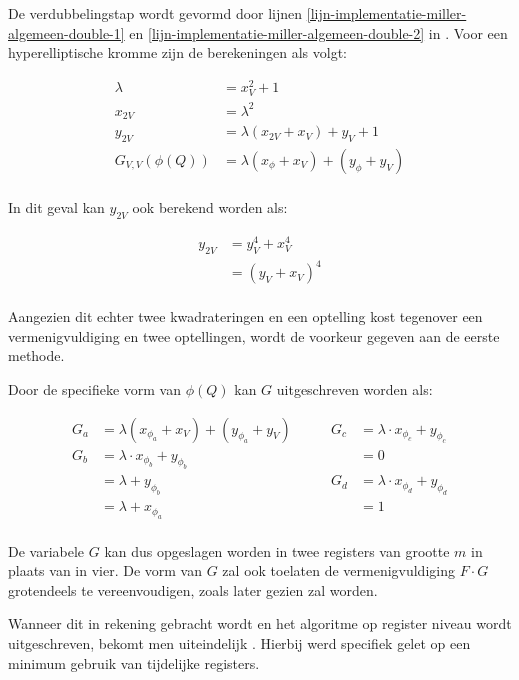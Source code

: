 De verdubbelingstap wordt gevormd door lijnen \ref{lijn-implementatie-miller-algemeen-double-1} en \ref{lijn-implementatie-miller-algemeen-double-2} in . Voor een hyperelliptische kromme zijn de berekeningen als volgt\cite{bertoni}:

\[\begin{aligned}
	\lambda &= x_V^2 + 1\\
	x_{2V} &= \lambda ^2\\
	y_{2V} &= \lambda (x_{2V} + x_V) + y_V + 1\\
	G_{V,V}(\phi(Q)) &= \lambda (x_{\phi} + x_V) + (y_{\phi} + y_V)\\
\end{aligned}\]

In dit geval kan $y_{2V}$ ook berekend worden als:

\[\begin{aligned}
y_{2V}	&= y_V^4 + x_V^4\\
			&= (y_V + x_V)^4\\	
\end{aligned}\]

Aangezien dit echter twee kwadrateringen en een optelling kost tegenover een vermenigvuldiging en twee optellingen, wordt de voorkeur gegeven aan de eerste methode.

Door de specifieke vorm van $\phi(Q)$ kan $G$ uitgeschreven worden als:

\[\begin{aligned}
	G_a	&=	\lambda (x_{\phi_a} + x_V) + (y_{\phi_a} + y_V)\qquad&
				G_c	&= \lambda \cdot x_{\phi_c} + y_{\phi_c}\\
	G_b	&=	\lambda \cdot x_{\phi_b} + y_{\phi_b}&
						&= 0\\
			&= \lambda + y_{\phi_b}&
				G_d	&= \lambda \cdot x_{\phi_d} + y_{\phi_d}\\
			&=	\lambda + x_{\phi_a}&
						&= 1\\
\end{aligned}\]

De variabele $G$ kan dus opgeslagen worden in twee registers van grootte $m$ in plaats van in vier. De vorm van $G$ zal ook toelaten de vermenigvuldiging $F \cdot G$ grotendeels te vereenvoudigen, zoals later gezien zal worden.

Wanneer dit in rekening gebracht wordt en het algoritme op register niveau wordt uitgeschreven, bekomt men uiteindelijk . Hierbij werd specifiek gelet op een minimum gebruik van tijdelijke registers.

